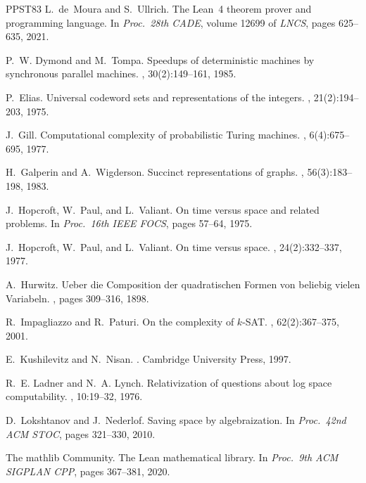 \documentclass[11pt]{article}
\theoremstyle{definition}
\theoremstyle{definition}
\theoremstyle{remark}
\begin{document}
\begin{thebibliography}{PPST83}
L.~de~Moura and S.~Ullrich.
\newblock The {L}ean~4 theorem prover and programming language.
\newblock In {\em Proc.\ 28th CADE}, volume 12699 of {\em LNCS}, pages 625--635, 2021.

P.~W. Dymond and M.~Tompa.
\newblock Speedups of deterministic machines by synchronous parallel machines.
, 30(2):149--161, 1985.

P.~Elias.
\newblock Universal codeword sets and representations of the integers.
, 21(2):194--203, 1975.

J.~Gill.
\newblock Computational complexity of probabilistic {T}uring machines.
, 6(4):675--695, 1977.

H.~Galperin and A.~Wigderson.
\newblock Succinct representations of graphs.
, 56(3):183--198, 1983.

J.~Hopcroft, W.~Paul, and L.~Valiant.
\newblock On time versus space and related problems.
\newblock In {\em Proc.\ 16th IEEE FOCS}, pages 57--64, 1975.

J.~Hopcroft, W.~Paul, and L.~Valiant.
\newblock On time versus space.
, 24(2):332--337, 1977.

A.~Hurwitz.
\newblock Ueber die {C}omposition der quadratischen {F}ormen von beliebig vielen {V}ariabeln.
, pages 309--316, 1898.

R.~Impagliazzo and R.~Paturi.
\newblock On the complexity of $k$-{SAT}.
, 62(2):367--375, 2001.

E.~Kushilevitz and N.~Nisan.
.
\newblock Cambridge University Press, 1997.

R.~E. Ladner and N.~A. Lynch.
\newblock Relativization of questions about log space computability.
, 10:19--32, 1976.

D.~Lokshtanov and J.~Nederlof.
\newblock Saving space by algebraization.
\newblock In {\em Proc.\ 42nd ACM STOC}, pages 321--330, 2010.

The mathlib Community.
\newblock The {L}ean mathematical library.
\newblock In {\em Proc.\ 9th ACM SIGPLAN CPP}, pages 367--381, 2020.


\end{thebibliography}
\end{document}
